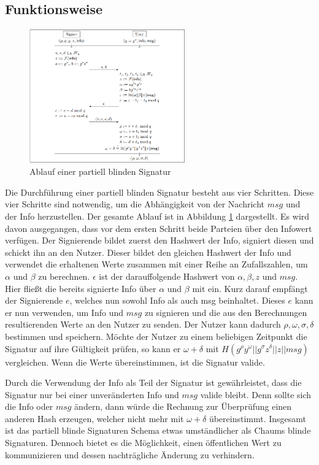 \documentclass[
	fontsize=11pt,
	headings=small,
	parskip=half,           %
	bibliography=totoc,
	numbers=noenddot,       %
	open=any,               %
]{scrreprt}
\begin{document}
\subsection{Funktionsweise}
\begin{figure}[h]
    \centering
    \includegraphics*[width=0.6\textwidth]{partBlindSig.png}
    \caption{Ablauf einer partiell blinden Signatur \cite{abe2000provably}}
    \label{fig:partBlindSig}
\end{figure}
Die Durchführung einer partiell blinden Signatur besteht aus vier Schritten. Diese vier Schritte sind notwendig, um die Abhängigkeit von der Nachricht $msg$ und der Info herzustellen. Der gesamte Ablauf ist in Abbildung \ref{fig:partBlindSig} dargestellt. Es wird davon ausgegangen, dass vor dem ersten Schritt beide Parteien über den Infowert verfügen. Der Signierende bildet zuerst den Hashwert der Info, signiert diesen und schickt ihn an den Nutzer. Dieser bildet den gleichen Hashwert der Info und verwendet die erhaltenen Werte zusammen mit einer Reihe an Zufallszahlen, um $\alpha$ und $\beta$ zu berechnen. $\epsilon$ ist der darauffolgende Hashwert von $\alpha,\beta,z$ und $msg$. Hier fließt die bereits signierte Info über $\alpha$ und $\beta$ mit ein. Kurz darauf empfängt der Signierende $e$, welches nun sowohl Info als auch msg beinhaltet. Dieses $e$ kann er nun verwenden, um Info und $msg$ zu signieren und die aus den Berechnungen resultierenden Werte an den Nutzer zu senden. Der Nutzer kann dadurch $\rho,\omega,\sigma,\delta$ bestimmen und speichern. Möchte der Nutzer zu einem beliebigen Zeitpunkt die Signatur auf ihre Gültigkeit prüfen, so kann er $\omega + \delta$ mit  $H (g^\rho y^\omega || g^\sigma z^\delta || z || msg)$ vergleichen. Wenn die Werte übereinstimmen, ist die Signatur valide.

Durch die Verwendung der Info als Teil der Signatur ist gewährleistet, dass die Signatur nur bei einer unveränderten Info und $msg$ valide bleibt. Denn sollte sich die Info oder $msg$ ändern, dann würde die Rechnung zur Überprüfung einen anderen Hash erzeugen, welcher nicht mehr mit $\omega+\delta$ übereinstimmt. Insgesamt ist das partiell blinde Signaturen Schema etwas umständlicher als Chaums blinde Signaturen. Dennoch bietet es die Möglichkeit, einen öffentlichen Wert zu kommunizieren und dessen nachträgliche Änderung zu verhindern.
\end{document}
